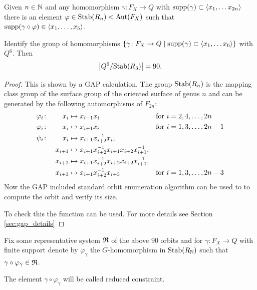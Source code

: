 \documentclass[a4paper,11pt]{amsart}
\begin{document}
\begin{lem}\label{lem:finitelyManyConstraints}
 Given $n\in \mathbb{N}$ and any homomorphism $\gamma\colon F_X \to Q$ with $\textup{supp}(\gamma) \subset \left<x_1,\ldots x_{2n}\right>$
 there is an element $\varphi \in \textup{Stab}(R_n)<\textup{Aut}(F_X)$ such that $\textup{supp}(\gamma\circ\varphi) \in \left<x_1,\ldots,x_5\right>$.
\end{lem}
\begin{lem}\label{lem:90Constraints}
 Identify the group of homomorphisms $\{\gamma \colon F_X \to Q \mid \textup{supp}(\gamma) \subset \left<x_1,\ldots x_6\right>\}$ with $Q^6$. 
 Then \[\left|{Q^6/\textup{Stab}(R_3)}\right|=90.\]
\end{lem}
\begin{proof}
 This is shown by a GAP calculation. The group $\textup{Stab}(R_n)$ is the mapping class group
 of the surface group of the oriented surface of genus $n$ and can be generated by the 
 following automorphisms of $F_{2n}$:
 \begin{align*}
  \varphi_i&\colon& x_i&\mapsto x_{i-1}x_i & \textup{for }&i=2,4,\ldots,2n \\
  \varphi_i&\colon&x_i&\mapsto x_{i+1}x_i & \textup{for }&i=1,3,\ldots,2n-1 \\
  \psi_i&\colon&x_i&\mapsto x_{i+1}x_{i+2}^{-1}x_i, && \\  
  &&x_{i+1}&\mapsto x_{i+1}x_{i+2}^{-1}x_{i+1}x_{i+2}x_{i+1}^{-1}, && \\  
  &&x_{i+2}&\mapsto x_{i+1}x_{i+2}^{-1}x_{i+2}x_{i+2}x_{i+1}^{-1}, && \\  
  &&x_{i+3}&\mapsto x_{i+1}x_{i+2}^{-1}x_{i+3}& \textup{for }&i=1,3,\ldots,2n-3   
 \end{align*}
 Now the GAP included standard orbit enumeration algorithm  can be used to 
 to compute the orbit and verify its size. 
 
 To check this the function 
 can be used. For more details see Section \ref{sec:gap_details}
\end{proof}
\begin{defi}
 Fix some representative system $\mathfrak{R}$ of the above $90$ orbits and for 
 $\gamma \colon F_X \to Q$ with finite support denote by $\varphi_\gamma$ the $G$-homomorphism in $\textup{Stab}(R_{\mathbb{N}})$ such that $\gamma\circ \varphi_\gamma \in \mathfrak{R}$.
 
 The element $\gamma \circ \varphi_\gamma$ will be called reduced constraint.
\end{defi}
\end{document}
